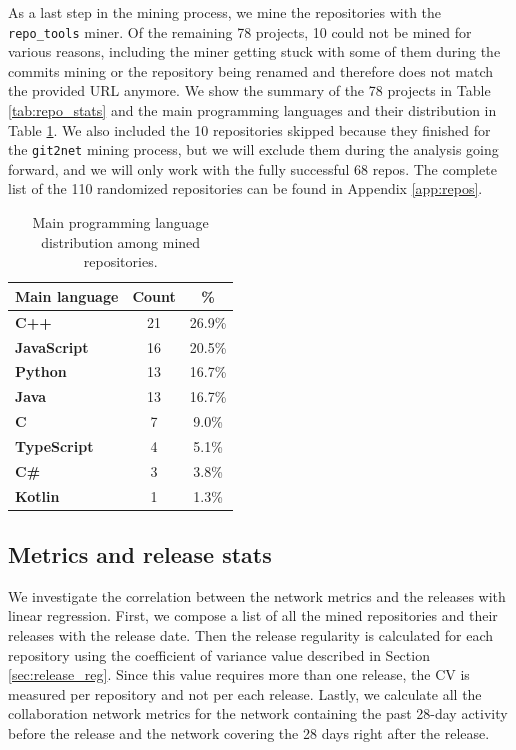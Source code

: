 As a last step in the mining process, we mine the repositories with the \texttt{repo\_tools} miner. Of the remaining 78 projects, 10 could not be mined for various reasons, including the miner getting stuck with some of them during the commits mining or the repository being renamed and therefore does not match the provided URL anymore. We show the summary of the 78 projects in Table \ref{tab:repo_stats} and the main programming languages and their distribution in Table \ref{tab:repo_lang}. We also included the 10 repositories skipped because they finished for the \texttt{git2net} mining process, but we will exclude them during the analysis going forward, and we will only work with the fully successful 68 repos. The complete list of the 110 randomized repositories can be found in Appendix \ref{app:repos}.

\begin{table}[!htbp]
    \centering
    \begin{tabular}{| l | c | c |}
        \hline
        \textbf{Main language} & \textbf{Count} & \textbf{\%} \\
        \hline
        \textbf{C++} & 21 & 26.9\% \\
        \textbf{JavaScript} & 16 & 20.5\% \\
        \textbf{Python} & 13 & 16.7\% \\
        \textbf{Java} & 13 & 16.7\% \\
        \textbf{C} & 7 & 9.0\% \\
        \textbf{TypeScript} & 4 & 5.1\% \\
        \textbf{C\#} & 3 & 3.8\% \\
        \textbf{Kotlin} & 1 & 1.3\% \\        
        \hline
    \end{tabular}
    \caption{Main programming language distribution among mined repositories.}
    \label{tab:repo_lang}
\end{table}

\subsection{Metrics and release stats}

We investigate the correlation between the network metrics and the releases with linear regression. First, we compose a list of all the mined repositories and their releases with the release date. Then the release regularity is calculated for each repository using the coefficient of variance value described in Section \ref{sec:release_reg}. Since this value requires more than one release, the CV is measured per repository and not per each release. Lastly, we calculate all the collaboration network metrics for the network containing the past 28-day activity before the release and the network covering the 28 days right after the release.

